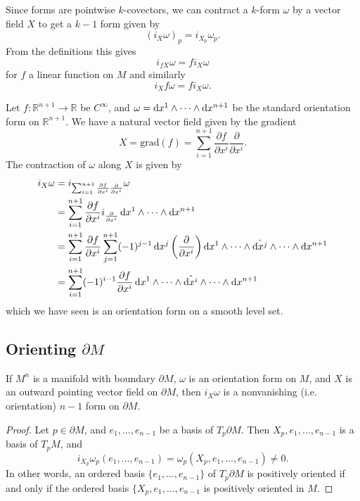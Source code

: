 Since forms are pointwise $k$-covectors, we can contract a $k$-form
$\omega$ by a vector field $X$ to get a $k-1$ form given by
$$
  (i_X \omega)_p
= i_{X_p} \omega_p.
$$
From the definitions this gives
$$
i_{f X} \omega = f i_X \omega
$$
for $f$ a linear function on $M$ and similarly
$$
i_X f \omega = f i_X \omega.
$$

\begin{xmpl}
Let $f: \mathbb{R}^{n+1} \to \mathbb{R}$ be $C^\infty$, and
$\omega = \mathop{}\!\mathrm{d} x^1 \wedge \cdots \wedge \mathop{}\!\mathrm{d} x^{n+1}$ be the standard
orientation form on $\mathbb{R}^{n+1}$. We have a natural vector field
given by the gradient
$$
  X
= \mathrm{grad}(f)
= \sum_{i=1}^{n+1}
    \frac{\partial f}{\partial x^i}
    \frac{\partial}{\partial x^i}.
$$
The contraction of $\omega$ along $X$ is given by
\begin{align*}
   i_X \omega
&= i_{
     \sum_{i=1}^{n+1}
       \frac{\partial f}{\partial x^i}
       \frac{\partial}{\partial x^i}
   }
   \omega \\
&= \sum_{i=1}^{n+1}
     \frac{\partial f}{\partial x^i}
     i_{\frac{\partial}{\partial x^i}}
     \dif x^1 \wedge \cdots \wedge \dif x^{n+1} \\
&= \sum_{i=1}^{n+1}
     \frac{\partial f}{\partial x^i}
     \sum_{j=1}^{n+1}
       (-1)^{j-1}
       \dif x^j\left(\frac{\partial}{\partial x^i}\right)
       \dif x^1 \wedge
       \cdots \wedge
       \hat{\dif x^j} \wedge
       \cdots \wedge
       \dif x^{n+1} \\
&= \sum_{i=1}^{n+1}
     (-1)^{i-1}
     \frac{\partial f}{\partial x^i}
     \dif x^1 \wedge
     \cdots \wedge
     \hat{\dif x^i} \wedge
     \cdots \wedge
     \dif x^{n+1}
\end{align*}
which we have seen is an orientation form on a smooth level set.
\end{xmpl}

\subsection{Orienting $\partial M$}
\begin{prop}
If $M^n$ is a manifold with boundary $\partial M$, $\omega$ is an
orientation form on $M$, and $X$ is an outward pointing vector field
on $\partial M$, then
$i_X\omega$ is a nonvanishing (i.e. orientation) $n-1$ form on
$\partial M$.
\end{prop}
\begin{proof}
Let $p \in \partial M$, and $e_1, \dots, e_{n-1}$ be a basis of
$T_p \partial M$. Then $X_p, e_1, \dots, e_{n-1}$ is a basis of
$T_p M$, and
$$
  i_{X_p}\omega_p
    (e_1, \dots, e_{n-1})
= \omega_p(X_p, e_1, \dots, e_{n-1}) \neq 0.
$$
In other words, an ordered basis $\{e_1, \dots, e_{n-1}\}$ of
$T_p \partial M$ is positively oriented if and only if the ordered
basis
$\{X_p, e_1, \dots, e_{n-1}$ is positively oriented in $M$.
\end{proof}

